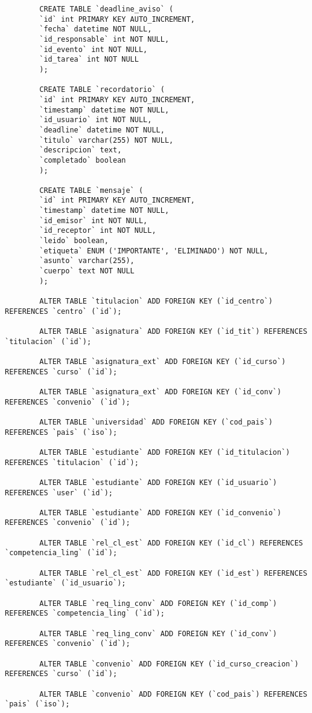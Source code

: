 \begin{verbatim}
		CREATE TABLE `deadline_aviso` (
		`id` int PRIMARY KEY AUTO_INCREMENT,
		`fecha` datetime NOT NULL,
		`id_responsable` int NOT NULL,
		`id_evento` int NOT NULL,
		`id_tarea` int NOT NULL
		);
		
		CREATE TABLE `recordatorio` (
		`id` int PRIMARY KEY AUTO_INCREMENT,
		`timestamp` datetime NOT NULL,
		`id_usuario` int NOT NULL,
		`deadline` datetime NOT NULL,
		`titulo` varchar(255) NOT NULL,
		`descripcion` text,
		`completado` boolean
		);
		
		CREATE TABLE `mensaje` (
		`id` int PRIMARY KEY AUTO_INCREMENT,
		`timestamp` datetime NOT NULL,
		`id_emisor` int NOT NULL,
		`id_receptor` int NOT NULL,
		`leido` boolean,
		`etiqueta` ENUM ('IMPORTANTE', 'ELIMINADO') NOT NULL,
		`asunto` varchar(255),
		`cuerpo` text NOT NULL
		);
		
		ALTER TABLE `titulacion` ADD FOREIGN KEY (`id_centro`) REFERENCES `centro` (`id`);
		
		ALTER TABLE `asignatura` ADD FOREIGN KEY (`id_tit`) REFERENCES `titulacion` (`id`);
		
		ALTER TABLE `asignatura_ext` ADD FOREIGN KEY (`id_curso`) REFERENCES `curso` (`id`);
		
		ALTER TABLE `asignatura_ext` ADD FOREIGN KEY (`id_conv`) REFERENCES `convenio` (`id`);
		
		ALTER TABLE `universidad` ADD FOREIGN KEY (`cod_pais`) REFERENCES `pais` (`iso`);
		
		ALTER TABLE `estudiante` ADD FOREIGN KEY (`id_titulacion`) REFERENCES `titulacion` (`id`);
		
		ALTER TABLE `estudiante` ADD FOREIGN KEY (`id_usuario`) REFERENCES `user` (`id`);
		
		ALTER TABLE `estudiante` ADD FOREIGN KEY (`id_convenio`) REFERENCES `convenio` (`id`);
		
		ALTER TABLE `rel_cl_est` ADD FOREIGN KEY (`id_cl`) REFERENCES `competencia_ling` (`id`);
		
		ALTER TABLE `rel_cl_est` ADD FOREIGN KEY (`id_est`) REFERENCES `estudiante` (`id_usuario`);
		
		ALTER TABLE `req_ling_conv` ADD FOREIGN KEY (`id_comp`) REFERENCES `competencia_ling` (`id`);
		
		ALTER TABLE `req_ling_conv` ADD FOREIGN KEY (`id_conv`) REFERENCES `convenio` (`id`);
		
		ALTER TABLE `convenio` ADD FOREIGN KEY (`id_curso_creacion`) REFERENCES `curso` (`id`);
		
		ALTER TABLE `convenio` ADD FOREIGN KEY (`cod_pais`) REFERENCES `pais` (`iso`);
		

\end{verbatim}
